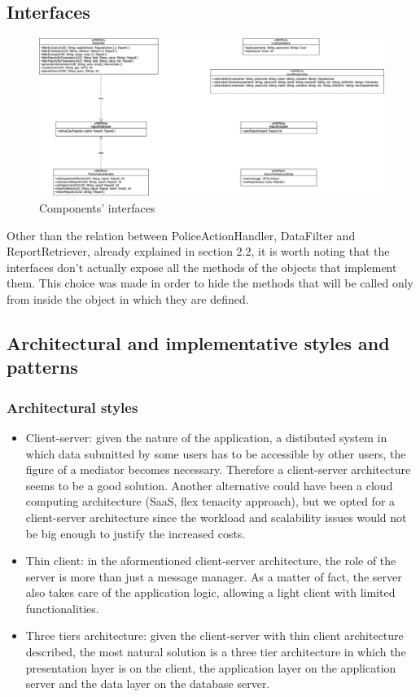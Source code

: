 \subsection{Interfaces}
\begin{figure}[H]
	\centering
	\includegraphics[width=\textwidth]{Images/interface_diagram}
	\caption{Components' interfaces}
\end{figure}
Other than the relation between PoliceActionHandler, DataFilter and ReportRetriever, already explained in section 2.2, it is worth noting that the interfaces don't actually expose all the methods of the objects that implement them. This choice was made in order to hide the methods that will be called only from inside the object in which they are defined.
\newpage 

\subsection{Architectural and implementative styles and patterns}

\subsubsection{Architectural styles}
\begin{itemize}
	\item Client-server: given the nature of the application, a distibuted system in which data submitted by some users has to be accessible by other users, the figure of a mediator becomes necessary. Therefore a client-server architecture seems to be a good solution. Another alternative could have been a cloud computing architecture (SaaS, flex tenacity approach), but we opted for a client-server architecture since the workload and scalability issues would not be big enough to justify the increased costs.
	\item Thin client: in the aformentioned client-server architecture, the role of the server is more than just a message manager. As a matter of fact, the server also takes care of the application logic, allowing a light client with limited functionalities.
	\item Three tiers architecture: given the client-server with thin client architecture described, the most natural solution is a three tier architecture in which the presentation layer is on the client, the application layer on the application server and the data layer on the database server. 
\end{itemize}

